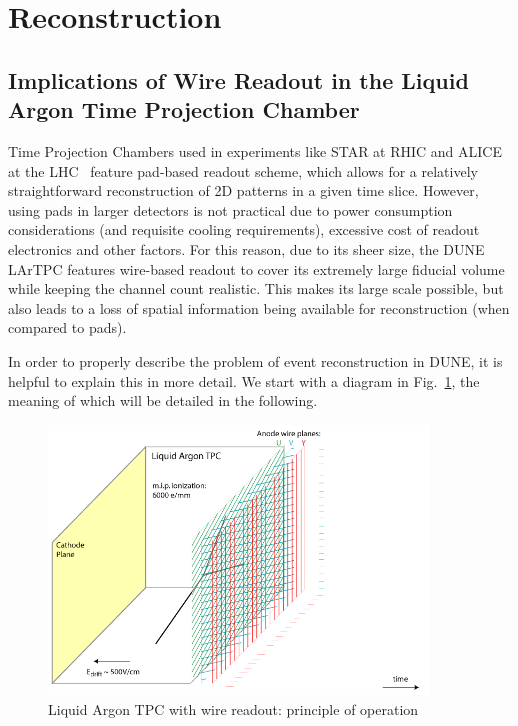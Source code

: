 \section{Reconstruction}
\subsection{Implications of Wire Readout in the Liquid Argon Time Projection Chamber}
Time Projection Chambers used in experiments like STAR at RHIC and ALICE at the LHC~\cite{alice}  feature
pad-based readout scheme, which allows for a relatively straightforward reconstruction of 2D patterns in
a given time slice. However, using pads in larger detectors is not practical due to power consumption considerations
(and requisite cooling requirements), excessive cost of readout electronics and other factors. For this reason,
due to its sheer size, the DUNE LArTPC features wire-based readout to cover its extremely large fiducial volume
while keeping the channel count realistic. This makes its large scale possible, but also leads to a loss of spatial information being available
for reconstruction (when compared to pads).

In order to properly describe the problem of event reconstruction in DUNE, it is helpful to explain this in more detail.
We start with a diagram in Fig.~\ref{fig:signal-0}, the meaning of which will be detailed in the following.
\label{sec:wirecell}
\begin{figure}[h!]
	\centering
	\includegraphics[width=0.9\textwidth]{signal-0.png}
	\caption{Liquid Argon TPC with wire readout: principle of operation}
	\label{fig:signal-0}
\end{figure}

